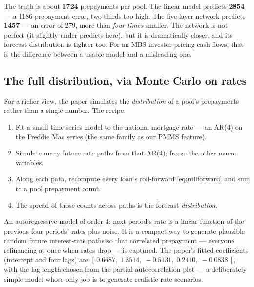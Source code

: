 \documentclass[11pt]{article}
\begin{document}
\begin{intuition}
The truth is about \textbf{1724} prepayments per pool. The linear model predicts
\textbf{2854} --- a 1186-prepayment error, two-thirds too high. The five-layer network predicts
\textbf{1457} --- an error of 279, more than \emph{four times} smaller. The network is not
perfect (it slightly under-predicts here), but it is dramatically closer, and its forecast
distribution is tighter too. For an MBS investor pricing cash flows, that is the difference
between a usable model and a misleading one.
\end{intuition}

\subsection{The full distribution, via Monte Carlo on rates}

For a richer view, the paper simulates the \emph{distribution} of a pool's prepayments rather
than a single number. The recipe:

\begin{enumerate}[leftmargin=1.6em, itemsep=2pt]
  \item Fit a small time-series model to the national mortgage rate --- an AR(4) on the
        Freddie Mac series (the same family as our PMMS feature).
  \item Simulate many future rate paths from that AR(4); freeze the other macro variables.
  \item Along each path, recompute every loan's roll-forward \eqref{eq:rollforward} and sum
        to a pool prepayment count.
  \item The spread of those counts across paths is the forecast \emph{distribution}.
\end{enumerate}

\begin{jargon}[AR(4)]
An autoregressive model of order 4: next period's rate is a linear function of the previous
four periods' rates plus noise. It is a compact way to generate plausible random future
interest-rate paths so that correlated prepayment --- everyone refinancing at once when rates
drop --- is captured. The paper's fitted coefficients (intercept and four lags) are
$[\,0.6687,\; 1.3514,\; -0.5131,\; 0.2410,\; -0.0838\,]$, with the lag length chosen from the
partial-autocorrelation plot --- a deliberately simple model whose only job is to generate
realistic rate scenarios.
\end{jargon}
\end{document}
